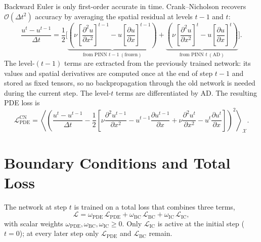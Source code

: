 Backward Euler is only first-order accurate in time. Crank--Nicholson recovers
$\mathcal{O}(\Delta t^2)$ accuracy by averaging the spatial residual at levels
$t-1$ and $t$:
\begin{equation}
  \frac{u^{t} - u^{t-1}}{\Delta t}
  = \frac{1}{2}\Bigg[
      \underbrace{\left(
        \nu\!\left[\frac{\partial^2 u}{\partial x^2}\right]^{\!t-1}
        - u\!\left[\frac{\partial u}{\partial x}\right]^{\!t-1}
      \right)}_{\text{from PINN }t{-}1\ (\text{frozen})}
      +
      \underbrace{\left(
        \nu\!\left[\frac{\partial^2 u}{\partial x^2}\right]^{\!t}
        - u\!\left[\frac{\partial u}{\partial x}\right]^{\!t}
      \right)}_{\text{from PINN }t\ (\text{AD})}
    \Bigg].
  \label{eq:cn_scheme}
\end{equation}
The level-$(t-1)$ terms are extracted from the previously trained network: its
values and spatial derivatives are computed once at the end of step $t-1$ and
stored as fixed tensors, so no backpropagation through the old network is
needed during the current step. The level-$t$ terms are differentiated by AD.
The resulting PDE loss is
\begin{equation}
  \mathcal{L}_\text{PDE}^{\text{CN}}
  = \left\langle\left(
      \frac{u^{t} - u^{t-1}}{\Delta t}
      - \frac{1}{2}\!\left[
          \nu\frac{\partial^2 u^{t-1}}{\partial x^2}
          - u^{t-1}\frac{\partial u^{t-1}}{\partial x}
          + \nu\frac{\partial^2 u^{t}}{\partial x^2}
          - u^{t}\frac{\partial u^{t}}{\partial x}
        \right]
    \right)^{\!2}\right\rangle_{\!\mathcal{X}}.
  \label{eq:loss_cn}
\end{equation}

\section{Boundary Conditions and Total Loss}
\label{sec:bc}

The network at step $t$ is trained on a total loss that combines three terms,
\begin{equation}
  \mathcal{L}
  = \omega_\text{PDE}\,\mathcal{L}_\text{PDE}
  + \omega_\text{BC}\,\mathcal{L}_\text{BC}
  + \omega_\text{IC}\,\mathcal{L}_\text{IC},
  \label{eq:total_loss}
\end{equation}
with scalar weights $\omega_\text{PDE}, \omega_\text{BC}, \omega_\text{IC}
\geq 0$. Only $\mathcal{L}_\text{IC}$ is active at the initial step ($t=0$); at
every later step only $\mathcal{L}_\text{PDE}$ and $\mathcal{L}_\text{BC}$
remain.

